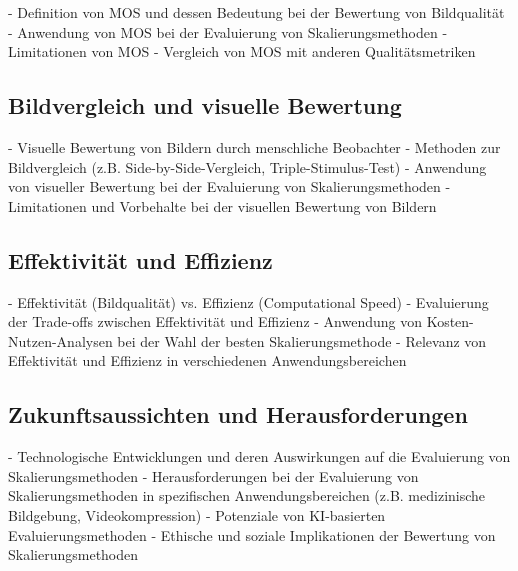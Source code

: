 - Definition von MOS und dessen Bedeutung bei der Bewertung von Bildqualität
- Anwendung von MOS bei der Evaluierung von Skalierungsmethoden
- Limitationen von MOS
- Vergleich von MOS mit anderen Qualitätsmetriken 

\subsection{Bildvergleich und visuelle Bewertung}

- Visuelle Bewertung von Bildern durch menschliche Beobachter
- Methoden zur Bildvergleich (z.B. Side-by-Side-Vergleich, Triple-Stimulus-Test)
- Anwendung von visueller Bewertung bei der Evaluierung von Skalierungsmethoden
- Limitationen und Vorbehalte bei der visuellen Bewertung von Bildern

\subsection{Effektivität und Effizienz}

- Effektivität (Bildqualität) vs. Effizienz (Computational Speed)
- Evaluierung der Trade-offs zwischen Effektivität und Effizienz
- Anwendung von Kosten-Nutzen-Analysen bei der Wahl der besten Skalierungsmethode
- Relevanz von Effektivität und Effizienz in verschiedenen Anwendungsbereichen

\subsection{Zukunftsaussichten und Herausforderungen}

- Technologische Entwicklungen und deren Auswirkungen auf die Evaluierung von Skalierungsmethoden
- Herausforderungen bei der Evaluierung von Skalierungsmethoden in spezifischen Anwendungsbereichen (z.B. medizinische Bildgebung, Videokompression)
- Potenziale von KI-basierten Evaluierungsmethoden
- Ethische und soziale Implikationen der Bewertung von Skalierungsmethoden

\newpage
